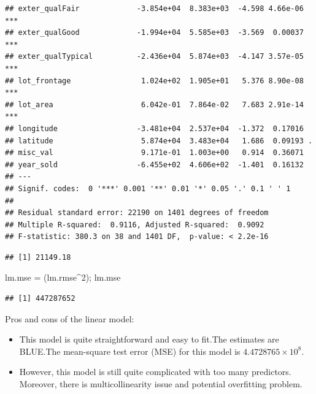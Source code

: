 \documentclass[
]{article}
\newenvironment{Shaded}{\begin{snugshade}}{\end{snugshade}}
\newcommand{\AttributeTok}[1]{\textcolor[rgb]{0.77,0.63,0.00}{#1}}
\newcommand{\CommentTok}[1]{\textcolor[rgb]{0.56,0.35,0.01}{\textit{#1}}}
\newcommand{\DecValTok}[1]{\textcolor[rgb]{0.00,0.00,0.81}{#1}}
\newcommand{\FunctionTok}[1]{\textcolor[rgb]{0.00,0.00,0.00}{#1}}
\newcommand{\NormalTok}[1]{#1}
\newcommand{\OtherTok}[1]{\textcolor[rgb]{0.56,0.35,0.01}{#1}}
\newcommand{\SpecialCharTok}[1]{\textcolor[rgb]{0.00,0.00,0.00}{#1}}
\begin{document}
\begin{verbatim}
## exter_qualFair             -3.854e+04  8.383e+03  -4.598 4.66e-06 ***
## exter_qualGood             -1.994e+04  5.585e+03  -3.569  0.00037 ***
## exter_qualTypical          -2.436e+04  5.874e+03  -4.147 3.57e-05 ***
## lot_frontage                1.024e+02  1.905e+01   5.376 8.90e-08 ***
## lot_area                    6.042e-01  7.864e-02   7.683 2.91e-14 ***
## longitude                  -3.481e+04  2.537e+04  -1.372  0.17016    
## latitude                    5.874e+04  3.483e+04   1.686  0.09193 .  
## misc_val                    9.171e-01  1.003e+00   0.914  0.36071    
## year_sold                  -6.455e+02  4.606e+02  -1.401  0.16132    
## ---
## Signif. codes:  0 '***' 0.001 '**' 0.01 '*' 0.05 '.' 0.1 ' ' 1
## 
## Residual standard error: 22190 on 1401 degrees of freedom
## Multiple R-squared:  0.9116, Adjusted R-squared:  0.9092 
## F-statistic: 380.3 on 38 and 1401 DF,  p-value: < 2.2e-16
\end{verbatim}

\begin{Shaded}
\end{Shaded}

\begin{verbatim}
## [1] 21149.18
\end{verbatim}

\begin{Shaded}
\begin{Highlighting}[]
\NormalTok{lm.mse }\OtherTok{=}\NormalTok{ (lm.rmse}\SpecialCharTok{\^{}}\DecValTok{2}\NormalTok{); lm.mse}
\end{Highlighting}
\end{Shaded}

\begin{verbatim}
## [1] 447287652
\end{verbatim}

Pros and cons of the linear model:

\begin{itemize}
\item
  This model is quite straightforward and easy to fit.The estimates are
  BLUE.The mean-square test error (MSE) for this model is
  \ensuremath{4.4728765\times 10^{8}}.
\item
  However, this model is still quite complicated with too many
  predictors. Moreover, there is multicollinearity issue and potential
  overfitting problem.
\end{itemize}
\end{document}

